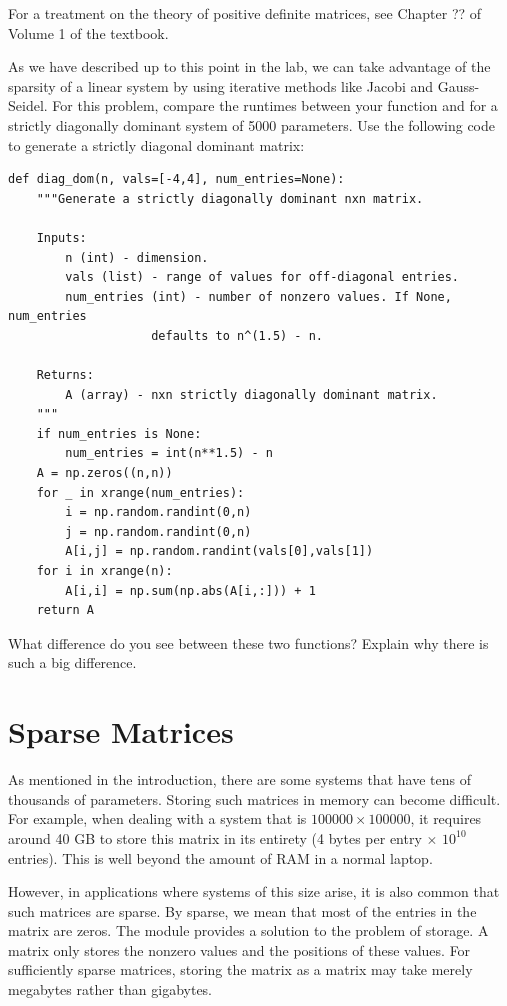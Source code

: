 For a treatment on the theory of positive definite matrices, see Chapter ?? of
Volume 1 of the textbook.

\begin{problem}
As we have described up to this point in the lab, we can take advantage of the
sparsity of a linear system by using iterative methods like Jacobi and Gauss-Seidel.
For this problem, compare the runtimes between your  function and
 for a strictly diagonally dominant system of 5000 parameters. Use the following
code to generate a strictly diagonal dominant matrix:
\begin{lstlisting}
def diag_dom(n, vals=[-4,4], num_entries=None):
    """Generate a strictly diagonally dominant nxn matrix.

    Inputs:
        n (int) - dimension.
        vals (list) - range of values for off-diagonal entries.
        num_entries (int) - number of nonzero values. If None, num_entries
                    defaults to n^(1.5) - n.

    Returns:
        A (array) - nxn strictly diagonally dominant matrix.
    """
    if num_entries is None:
        num_entries = int(n**1.5) - n
    A = np.zeros((n,n))
    for _ in xrange(num_entries):
        i = np.random.randint(0,n)
        j = np.random.randint(0,n)
        A[i,j] = np.random.randint(vals[0],vals[1])
    for i in xrange(n):
        A[i,i] = np.sum(np.abs(A[i,:])) + 1
    return A
\end{lstlisting}
What difference do you see between these two functions? Explain why there is such a big difference.
\end{problem}

\section*{Sparse Matrices}
As mentioned in the introduction, there are some systems that have tens of
thousands of parameters. Storing such matrices in memory can become difficult.
For example, when dealing with a system that is $100000 \times 100000$, it
requires around 40 GB to store this matrix in its entirety (4 bytes per entry
$\times$ $10^{10}$ entries). This is well beyond the amount of RAM in a normal
laptop.

However, in applications where systems of this size arise, it is also common
that such matrices are sparse. By sparse, we mean that most of the entries in
the matrix are zeros. The  module provides a solution to the
problem of storage. A  matrix only stores the nonzero values and the positions
of these values. For sufficiently sparse matrices, storing the matrix as a
 matrix may take merely megabytes rather than gigabytes.

